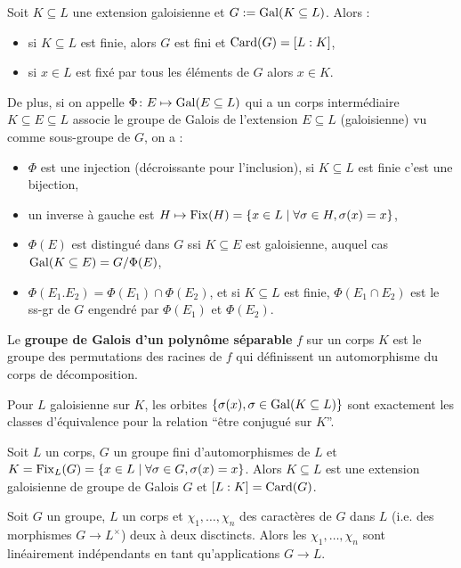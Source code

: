 	\begin{thm}
		Soit $K \subseteq L$ une extension galoisienne et $G := \operatorname{Gal}(K \subseteq L)$.
		Alors :
		\begin{itemize}
			\item[\textbullet] si $K \subseteq L$ est finie, alors $G$ est fini et $\operatorname{Card}(G) = [L : K]$,
			\item[\textbullet] si $x \in L$ est fixé par tous les éléments de $G$ alors $x \in K$.
		\end{itemize}
		De plus, si on appelle $\Phi \colon E \mapsto \operatorname{Gal}(E \subseteq L)$ qui a un corps intermédiaire $K \subseteq E \subseteq L$ associe le groupe de Galois de l'extension $E \subseteq L$ (galoisienne) vu comme sous-groupe de $G$, on a :
		\begin{itemize}
			\item[\textbullet] $\Phi$ est une injection (décroissante pour l'inclusion), si $K \subseteq L$ est finie c'est une bijection,
			\item[\textbullet] un inverse à gauche est $H \mapsto \operatorname{Fix}(H) = \{ x \in L \mid \forall \sigma \in H, \sigma(x) = x \}$,
			\item[\textbullet] $\Phi(E)$ est distingué dans $G$ ssi $K \subseteq E$ est galoisienne, auquel cas $\operatorname{Gal}(K \subseteq E) = G/\Phi(E)$,
			\item[\textbullet] $\Phi(E_1 . E_2) = \Phi(E_1) \cap \Phi(E_2)$, et si $K \subseteq L$ est finie, $\Phi(E_1 \cap E_2)$ est le ss-gr de $G$ engendré par $\Phi(E_1)$ et $\Phi(E_2)$.
		\end{itemize}
	\end{thm}
	
	\begin{defn}
		Le \textbf{groupe de Galois d'un polynôme séparable} $f$ sur un corps $K$ est le groupe des permutations des racines de $f$ qui définissent un automorphisme du corps de décomposition.
	\end{defn}
	
	\begin{rem}
		Pour $L$ galoisienne sur $K$, les orbites $\{ \sigma(x), \sigma \in \operatorname{Gal}(K \subseteq L) \}$ sont exactement les classes d'équivalence pour la relation “être conjugué sur $K$”.
	\end{rem}
	
	\begin{thm}
		Soit $L$ un corps, $G$ un groupe fini d'automorphismes de $L$ et $K = \operatorname{Fix}_L(G) = \{ x \in L \mid \forall \sigma \in G, \sigma(x) = x \}$.
		Alors $K \subseteq L$ est une extension galoisienne de groupe de Galois $G$ et $[L : K] = \operatorname{Card}(G)$.
	\end{thm}
	
	\begin{thm}
		Soit $G$ un groupe, $L$ un corps et $\chi_1,\ldots,\chi_n$ des caractères de $G$ dans $L$ (i.e. des morphismes $G \to L^\times$) deux à deux disctincts.
		Alors les $\chi_1,\ldots,\chi_n$ sont linéairement indépendants en tant qu'applications $G \to L$.
	\end{thm}